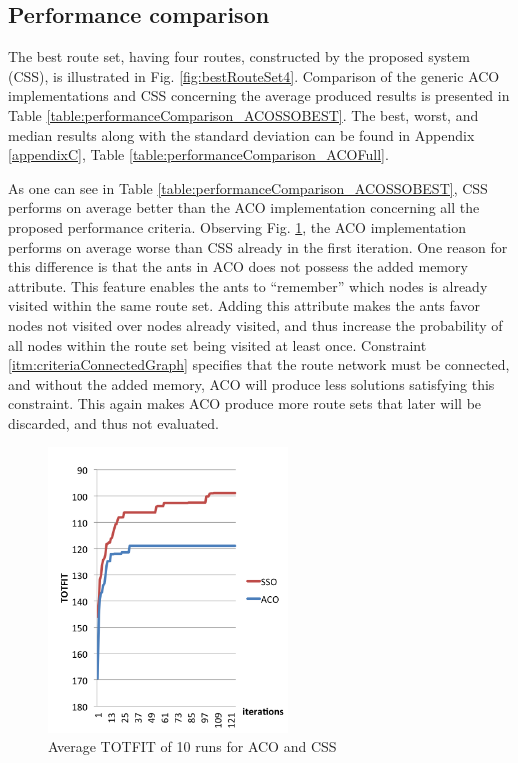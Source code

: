 \subsection{Performance comparison}
\label{subsec:performanceComparisonDiscussion}


The best route set, having four routes, constructed by the proposed system (CSS), is illustrated in Fig. \vref{fig:bestRouteSet4}. Comparison of the generic ACO implementations and CSS concerning the average produced results is presented in Table \vref{table:performanceComparison_ACOSSOBEST}. The best, worst, and median results along with the standard deviation can be found in Appendix \ref{appendixC}, Table \vref{table:performanceComparison_ACOFull}. 

As one can see in Table \vref{table:performanceComparison_ACOSSOBEST}, CSS performs on average better than the ACO implementation concerning all the proposed performance criteria. Observing Fig. \ref{fig:acovssso}, the ACO implementation performs on average worse than CSS already in the first iteration. One reason for this difference is that the ants in ACO does not possess the added memory attribute. This feature enables the ants to ``remember'' which nodes is already visited within the same route set. Adding this attribute makes the ants favor nodes not visited over nodes already visited, and thus increase the probability of all nodes within the route set being visited at least once. Constraint \vref{itm:criteriaConnectedGraph} specifies that the route network must be connected, and without the added memory, ACO will produce less solutions satisfying this constraint. This again makes ACO produce more route sets that later will be discarded, and thus not evaluated. %

 \begin{figure}[H]
    \begin{center}
    \includegraphics[width=2.5in]{assets/acovsssoNEW.png}
    \end{center}
    \caption{Average TOTFIT of 10 runs for ACO and CSS}
    \label{fig:acovssso} 
\end{figure}

